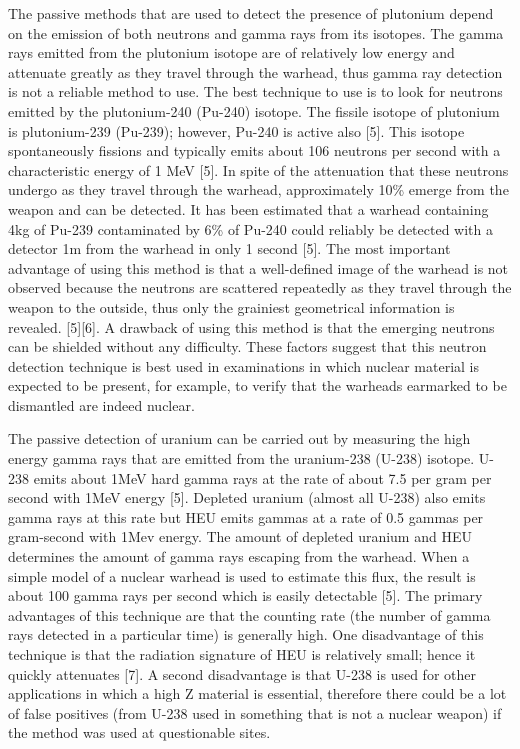 \documentclass[a4paper]{article}
\begin{document}
The passive methods that are used to detect the presence of plutonium depend on the
emission of both neutrons and gamma rays from its isotopes. The gamma rays emitted from the
plutonium isotope are of relatively low energy and attenuate greatly as they travel through the
warhead, thus gamma ray detection is not a reliable method to use. The best technique to use is
to look for neutrons emitted by the plutonium-240 (Pu-240) isotope. The fissile isotope of
plutonium is plutonium-239 (Pu-239); however, Pu-240 is active also [5]. This isotope
spontaneously fissions and typically emits about 106 neutrons per second with a characteristic
energy of 1 MeV [5]. In spite of the attenuation that these neutrons undergo as they travel
through the warhead, approximately 10\% emerge from the weapon and can be detected. It has
been estimated that a warhead containing 4kg of Pu-239 contaminated by 6\% of Pu-240 could
reliably be detected with a detector 1m from the warhead in only 1 second [5]. The most
important advantage of using this method is that a well-defined image of the warhead is not
observed because the neutrons are scattered repeatedly as they travel through the weapon to the
outside, thus only the grainiest geometrical information is revealed. [5][6]. A drawback of using
this method is that the emerging neutrons can be shielded without any difficulty. These factors
suggest that this neutron detection technique is best used in examinations in which nuclear
material is expected to be present, for example, to verify that the warheads earmarked to be
dismantled are indeed nuclear.

The passive detection of uranium can be carried out by measuring the high energy
gamma rays that are emitted from the uranium-238 (U-238) isotope. U-238 emits about 1MeV
hard gamma rays at the rate of about 7.5 per gram per second with 1MeV energy [5]. Depleted
uranium (almost all U-238) also emits gamma rays at this rate but HEU emits gammas at a rate
of 0.5 gammas per gram-second with 1Mev energy. The amount of depleted uranium and HEU
determines the amount of gamma rays escaping from the warhead. When a simple model of a
nuclear warhead is used to estimate this flux, the result is about 100 gamma rays per second
which is easily detectable [5]. The primary advantages of this technique are that the counting rate
(the number of gamma rays detected in a particular time) is generally high. One disadvantage of
this technique is that the radiation signature of HEU is relatively small; hence it quickly
attenuates [7]. A second disadvantage is that U-238 is used for other applications in which a high
Z material is essential, therefore there could be a lot of false positives (from U-238 used in
something that is not a nuclear weapon) if the method was used at questionable sites.
\end{document}
